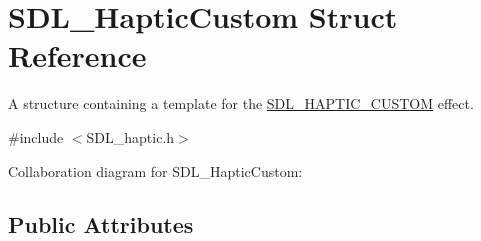 \hypertarget{struct_s_d_l___haptic_custom}{\section{S\-D\-L\-\_\-\-Haptic\-Custom Struct Reference}
\label{struct_s_d_l___haptic_custom}
}


A structure containing a template for the \hyperlink{_s_d_l__haptic_8h_a8a18c4de1076ac9bebd718329d16db29}{S\-D\-L\-\_\-\-H\-A\-P\-T\-I\-C\-\_\-\-C\-U\-S\-T\-O\-M} effect.  




{\ttfamily \#include $<$S\-D\-L\-\_\-haptic.\-h$>$}



Collaboration diagram for S\-D\-L\-\_\-\-Haptic\-Custom\-:
\subsection*{Public Attributes}
